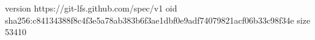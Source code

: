 version https://git-lfs.github.com/spec/v1
oid sha256:c84134388f8c4f3e5a78ab383b6f3ae1dbf0e9adf74079821acf06b33c98f34e
size 53410
